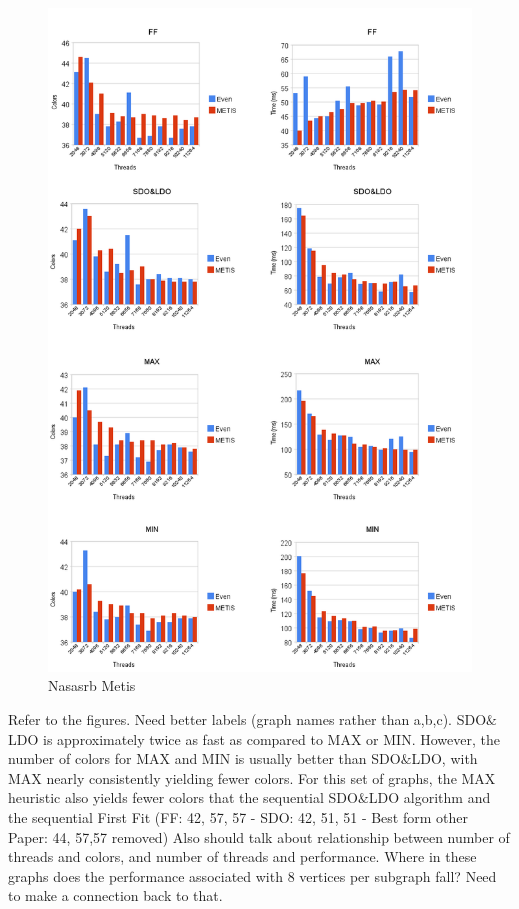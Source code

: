 \documentclass[preprint]{sigplanconf}
\begin{document}
\begin{figure}[h]
  \includegraphics[scale=0.45]{figures/nasasrbMetis.png}
  \caption{ Nasasrb Metis }
\end{figure}

Refer to the figures.  Need better labels (graph names rather than a,b,c).  SDO$\&$LDO is approximately twice as fast as compared to MAX or MIN. However, the number of colors for MAX and MIN is usually better than SDO$\&$LDO, with MAX nearly consistently yielding  fewer colors. For this set of graphs, the MAX heuristic also yields fewer colors that the sequential SDO$\&$LDO algorithm and the sequential First Fit   (FF: 42, 57, 57 - SDO: 42, 51, 51 - Best form other Paper: 44, 57,57 removed)  Also should talk about relationship between number of threads and colors, and number of threads and performance.  Where in these graphs does the performance associated with 8 vertices per subgraph fall?  Need to make a connection back to that.\
\end{document}
